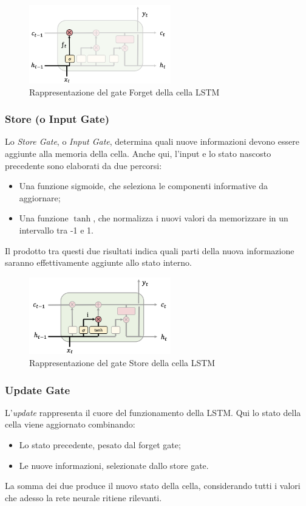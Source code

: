 \begin{figure}[!ht]
    \centering
    \includegraphics[width=0.55\textwidth]{figure/ForgetLSTM.png}
    \caption{Rappresentazione del gate Forget della cella LSTM}
    \label{fig:LSTMForget}
\end{figure}

\subsubsection{Store (o Input Gate)}
Lo \textit{Store Gate}, o \textit{Input Gate}, determina quali nuove informazioni devono essere aggiunte alla memoria della cella. Anche qui, l'input e lo stato nascosto precedente sono elaborati da due percorsi:
\begin{itemize}
    \item Una funzione sigmoide, che seleziona le componenti informative da aggiornare;
    \item Una funzione $\tanh$, che normalizza i nuovi valori da memorizzare in un intervallo tra -1 e 1.
\end{itemize}
Il prodotto tra questi due risultati indica quali parti della nuova informazione saranno effettivamente aggiunte allo stato interno.

\begin{figure}[!ht]
    \centering
    \includegraphics[width=0.55\textwidth]{figure/StoreLSTM.png}
    \caption{Rappresentazione del gate Store della cella LSTM}
    \label{fig:LSTMStore}
\end{figure}

\subsubsection{Update Gate}
L’\textit{update} rappresenta il cuore del funzionamento della LSTM. Qui lo stato della cella viene aggiornato combinando:
\begin{itemize}
    \item Lo stato precedente, pesato dal forget gate;
    \item Le nuove informazioni, selezionate dallo store gate.
\end{itemize}
La somma dei due produce il nuovo stato della cella, considerando tutti i valori che adesso la rete neurale ritiene rilevanti.

